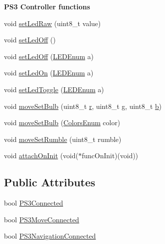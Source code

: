 \begin{Indent}{\bf \-P\-S3 \-Controller functions}
\begin{DoxyCompactItemize}
\item 
void \hyperlink{class_p_s3_u_s_b_aa0aac5ea016db4cd6736a15e9d6eb41b}{set\-Led\-Raw} (uint8\-\_\-t value)
\item 
void \hyperlink{class_p_s3_u_s_b_ac912fd49bd2a415206df7a8c2b672ea4}{set\-Led\-Off} ()
\item 
void \hyperlink{class_p_s3_u_s_b_ae13c95a649aba7315c2a18eb5f4277a9}{set\-Led\-Off} (\hyperlink{controller_enums_8h_a70df64e026046bc352983127b7ae2cf0}{\-L\-E\-D\-Enum} a)
\item 
void \hyperlink{class_p_s3_u_s_b_a3ad10dc81cfca1bdeb2f1310ddf4419d}{set\-Led\-On} (\hyperlink{controller_enums_8h_a70df64e026046bc352983127b7ae2cf0}{\-L\-E\-D\-Enum} a)
\item 
void \hyperlink{class_p_s3_u_s_b_a87db50031f7e265baaa82365c14befae}{set\-Led\-Toggle} (\hyperlink{controller_enums_8h_a70df64e026046bc352983127b7ae2cf0}{\-L\-E\-D\-Enum} a)
\item 
void \hyperlink{class_p_s3_u_s_b_ae9cfdaad3e54dbc271519e22082399c7}{move\-Set\-Bulb} (uint8\-\_\-t \hyperlink{_p_s4_parser_8h_a4c5c6ceb8ed33456261fa907136e0c3a}{r}, uint8\-\_\-t \hyperlink{_p_s4_parser_8h_a1673907d4d89d763bb7b94ec1eeb7b60}{g}, uint8\-\_\-t \hyperlink{_p_s4_parser_8h_a4313c9563516f94387762ab05763456b}{b})
\item 
void \hyperlink{class_p_s3_u_s_b_a9eeb0f71719732e44929c64f23c8314c}{move\-Set\-Bulb} (\hyperlink{controller_enums_8h_aac6fa7b0395b95cc528deaad0ce884a2}{\-Colors\-Enum} color)
\item 
void \hyperlink{class_p_s3_u_s_b_a66d542c2cec73cefb3cdda36ff080e1a}{move\-Set\-Rumble} (uint8\-\_\-t rumble)
\item 
void \hyperlink{class_p_s3_u_s_b_ad06a172d85adf4ffc54dd8117b0be42e}{attach\-On\-Init} (void($\ast$func\-On\-Init)(void))
\end{DoxyCompactItemize}
\end{Indent}
\subsection*{\-Public \-Attributes}
\begin{DoxyCompactItemize}
\item 
bool \hyperlink{class_p_s3_u_s_b_a0dad8754ff18d0c375c2569791d50876}{\-P\-S3\-Connected}
\item 
bool \hyperlink{class_p_s3_u_s_b_a89aa4233f3eeeb99693a099da527ec28}{\-P\-S3\-Move\-Connected}
\item 
bool \hyperlink{class_p_s3_u_s_b_a54b2dcaa1e9acef83de2376b50c7ff09}{\-P\-S3\-Navigation\-Connected}
\end{DoxyCompactItemize}
